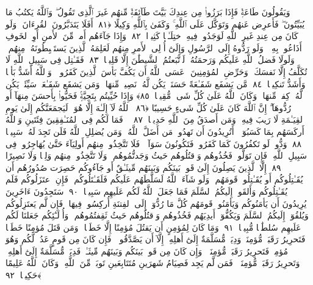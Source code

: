  وَيَقُولُونَ طَاعَةٌۭ فَإِذَا بَرَزُوا۟ مِن عِندِكَ بَيَّتَ طَآئِفَةٌۭ مِّنهُم غَيرَ ٱلَّذِى تَقُولُ ۖ وَٱللَّهُ يَكتُبُ مَا يُبَيِّتُونَ ۖ فَأَعرِض عَنهُم وَتَوَكَّل عَلَى ٱللَّهِ ۚ وَكَفَىٰ بِٱللَّهِ وَكِيلًا ﴿٨١﴾
 أَفَلَا يَتَدَبَّرُونَ ٱلقُرءَانَ ۚ وَلَو كَانَ مِن عِندِ غَيرِ ٱللَّهِ لَوَجَدُوا۟ فِيهِ ٱختِلَـٰفًۭا كَثِيرًۭا ﴿٨٢﴾
 وَإِذَا جَآءَهُم أَمرٌۭ مِّنَ ٱلأَمنِ أَوِ ٱلخَوفِ أَذَاعُوا۟ بِهِۦ ۖ وَلَو رَدُّوهُ إِلَى ٱلرَّسُولِ وَإِلَىٰٓ أُو۟لِى ٱلأَمرِ مِنهُم لَعَلِمَهُ ٱلَّذِينَ يَستَنۢبِطُونَهُۥ مِنهُم ۗ وَلَولَا فَضلُ ٱللَّهِ عَلَيكُم وَرَحمَتُهُۥ لَٱتَّبَعتُمُ ٱلشَّيطَٰنَ إِلَّا قَلِيلًۭا ﴿٨٣﴾
 فَقَـٰتِل فِى سَبِيلِ ٱللَّهِ لَا تُكَلَّفُ إِلَّا نَفسَكَ ۚ وَحَرِّضِ ٱلمُؤمِنِينَ ۖ عَسَى ٱللَّهُ أَن يَكُفَّ بَأسَ ٱلَّذِينَ كَفَرُوا۟ ۚ وَٱللَّهُ أَشَدُّ بَأسًۭا وَأَشَدُّ تَنكِيلًۭا ﴿٨٤﴾
 مَّن يَشفَع شَفَـٰعَةً حَسَنَةًۭ يَكُن لَّهُۥ نَصِيبٌۭ مِّنهَا ۖ وَمَن يَشفَع شَفَـٰعَةًۭ سَيِّئَةًۭ يَكُن لَّهُۥ كِفلٌۭ مِّنهَا ۗ وَكَانَ ٱللَّهُ عَلَىٰ كُلِّ شَىءٍۢ مُّقِيتًۭا ﴿٨٥﴾
 وَإِذَا حُيِّيتُم بِتَحِيَّةٍۢ فَحَيُّوا۟ بِأَحسَنَ مِنهَآ أَو رُدُّوهَآ ۗ إِنَّ ٱللَّهَ كَانَ عَلَىٰ كُلِّ شَىءٍ حَسِيبًا ﴿٨٦﴾
 ٱللَّهُ لَآ إِلَـٰهَ إِلَّا هُوَ ۚ لَيَجمَعَنَّكُم إِلَىٰ يَومِ ٱلقِيَـٰمَةِ لَا رَيبَ فِيهِ ۗ وَمَن أَصدَقُ مِنَ ٱللَّهِ حَدِيثًۭا ﴿٨٧﴾
 ۞ فَمَا لَكُم فِى ٱلمُنَـٰفِقِينَ فِئَتَينِ وَٱللَّهُ أَركَسَهُم بِمَا كَسَبُوٓا۟ ۚ أَتُرِيدُونَ أَن تَهدُوا۟ مَن أَضَلَّ ٱللَّهُ ۖ وَمَن يُضلِلِ ٱللَّهُ فَلَن تَجِدَ لَهُۥ سَبِيلًۭا ﴿٨٨﴾
 وَدُّوا۟ لَو تَكفُرُونَ كَمَا كَفَرُوا۟ فَتَكُونُونَ سَوَآءًۭ ۖ فَلَا تَتَّخِذُوا۟ مِنهُم أَولِيَآءَ حَتَّىٰ يُهَاجِرُوا۟ فِى سَبِيلِ ٱللَّهِ ۚ فَإِن تَوَلَّوا۟ فَخُذُوهُم وَٱقتُلُوهُم حَيثُ وَجَدتُّمُوهُم ۖ وَلَا تَتَّخِذُوا۟ مِنهُم وَلِيًّۭا وَلَا نَصِيرًا ﴿٨٩﴾
 إِلَّا ٱلَّذِينَ يَصِلُونَ إِلَىٰ قَومٍۭ بَينَكُم وَبَينَهُم مِّيثَـٰقٌ أَو جَآءُوكُم حَصِرَت صُدُورُهُم أَن يُقَـٰتِلُوكُم أَو يُقَـٰتِلُوا۟ قَومَهُم ۚ وَلَو شَآءَ ٱللَّهُ لَسَلَّطَهُم عَلَيكُم فَلَقَـٰتَلُوكُم ۚ فَإِنِ ٱعتَزَلُوكُم فَلَم يُقَـٰتِلُوكُم وَأَلقَوا۟ إِلَيكُمُ ٱلسَّلَمَ فَمَا جَعَلَ ٱللَّهُ لَكُم عَلَيهِم سَبِيلًۭا ﴿٩٠﴾
 سَتَجِدُونَ ءَاخَرِينَ يُرِيدُونَ أَن يَأمَنُوكُم وَيَأمَنُوا۟ قَومَهُم كُلَّ مَا رُدُّوٓا۟ إِلَى ٱلفِتنَةِ أُركِسُوا۟ فِيهَا ۚ فَإِن لَّم يَعتَزِلُوكُم وَيُلقُوٓا۟ إِلَيكُمُ ٱلسَّلَمَ وَيَكُفُّوٓا۟ أَيدِيَهُم فَخُذُوهُم وَٱقتُلُوهُم حَيثُ ثَقِفتُمُوهُم ۚ وَأُو۟لَـٰٓئِكُم جَعَلنَا لَكُم عَلَيهِم سُلطَٰنًۭا مُّبِينًۭا ﴿٩١﴾
 وَمَا كَانَ لِمُؤمِنٍ أَن يَقتُلَ مُؤمِنًا إِلَّا خَطَـًۭٔا ۚ وَمَن قَتَلَ مُؤمِنًا خَطَـًۭٔا فَتَحرِيرُ رَقَبَةٍۢ مُّؤمِنَةٍۢ وَدِيَةٌۭ مُّسَلَّمَةٌ إِلَىٰٓ أَهلِهِۦٓ إِلَّآ أَن يَصَّدَّقُوا۟ ۚ فَإِن كَانَ مِن قَومٍ عَدُوٍّۢ لَّكُم وَهُوَ مُؤمِنٌۭ فَتَحرِيرُ رَقَبَةٍۢ مُّؤمِنَةٍۢ ۖ وَإِن كَانَ مِن قَومٍۭ بَينَكُم وَبَينَهُم مِّيثَـٰقٌۭ فَدِيَةٌۭ مُّسَلَّمَةٌ إِلَىٰٓ أَهلِهِۦ وَتَحرِيرُ رَقَبَةٍۢ مُّؤمِنَةٍۢ ۖ فَمَن لَّم يَجِد فَصِيَامُ شَهرَينِ مُتَتَابِعَينِ تَوبَةًۭ مِّنَ ٱللَّهِ ۗ وَكَانَ ٱللَّهُ عَلِيمًا حَكِيمًۭا ﴿٩٢﴾
